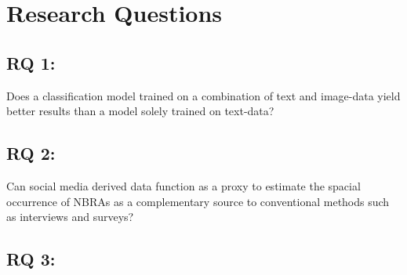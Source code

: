 \chapter{Research Questions} \label{research_questions}

\section{RQ 1:}
Does a classification model trained on a combination of text and image-data yield better results than a model solely trained on text-data?

\section{RQ 2:}
Can social media derived data function as a proxy to estimate the spacial occurrence of NBRAs as a complementary source to conventional methods such as interviews and surveys?

\section{RQ 3:}



